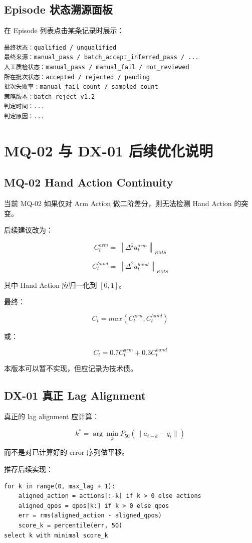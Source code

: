 \documentclass[UTF8,12pt,a4paper]{ctexart}
\begin{document}
\subsection{Episode 状态溯源面板}

在 Episode 列表点击某条记录时展示：

\begin{lstlisting}
最终状态：qualified / unqualified
最终来源：manual_pass / batch_accept_inferred_pass / ...
人工质检状态：manual_pass / manual_fail / not_reviewed
所在批次状态：accepted / rejected / pending
批次失败率：manual_fail_count / sampled_count
策略版本：batch-reject-v1.2
判定时间：...
判定原因：...
\end{lstlisting}

\section{MQ-02 与 DX-01 后续优化说明}

\subsection{MQ-02 Hand Action Continuity}

当前 MQ-02 如果仅对 Arm Action 做二阶差分，则无法检测 Hand Action 的突变。

后续建议改为：

\[
C_t^{arm}=\left\|\Delta^2 a_t^{arm}\right\|_{RMS}
\]

\[
C_t^{hand}=\left\|\Delta^2 a_t^{hand}\right\|_{RMS}
\]

其中 Hand Action 应归一化到 $[0,1]$。

最终：

\[
C_t=max(C_t^{arm},C_t^{hand})
\]

或：

\[
C_t=0.7C_t^{arm}+0.3C_t^{hand}
\]

本版本可以暂不实现，但应记录为技术债。

\subsection{DX-01 真正 Lag Alignment}

真正的 lag alignment 应计算：

\[
k^*=\arg\min_k P_{50}(\|a_{t-k}-q_t\|)
\]

而不是对已计算好的 error 序列做平移。

推荐后续实现：

\begin{lstlisting}
for k in range(0, max_lag + 1):
    aligned_action = actions[:-k] if k > 0 else actions
    aligned_qpos = qpos[k:] if k > 0 else qpos
    err = rms(aligned_action - aligned_qpos)
    score_k = percentile(err, 50)
select k with minimal score_k
\end{lstlisting}
\end{document}
